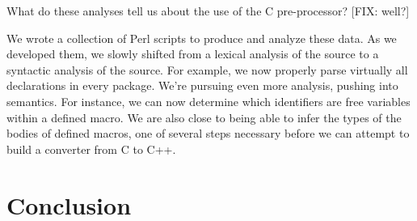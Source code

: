 What do these analyses tell us about the use of the C pre-processor?
[FIX: well?] 

We wrote a collection of Perl scripts to produce and analyze these
data.  As we developed them, we slowly shifted from a lexical analysis
of the source to a syntactic analysis of the source.  For example, we
now properly parse virtually all declarations in every package.  We're
pursuing even more analysis, pushing into semantics.  For instance, we
can now determine which identifiers are free variables within a defined
macro.  We are also close to being able to infer the types of the bodies
of defined macros, one of several steps necessary before we can attempt
to build a converter from C to C++.

\section{Conclusion}\label{sec:conclusion}

\small 




